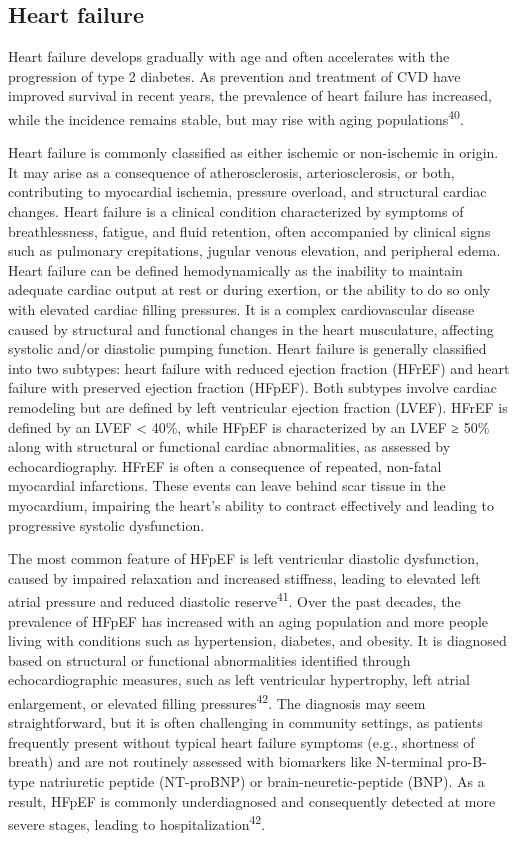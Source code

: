 \documentclass[
  a4paper,
  headsepline=true,
  open=any]{scrbook}
\begin{document}
\hypertarget{heart-failure}{%
\subsection{Heart failure}\label{heart-failure}}

Heart failure develops gradually with age and often accelerates with the
progression of type 2 diabetes. As prevention and treatment of CVD have
improved survival in recent years, the prevalence of heart failure has
increased, while the incidence remains stable, but may rise with aging
populations\textsuperscript{40}.

Heart failure is commonly classified as either ischemic or non-ischemic
in origin. It may arise as a consequence of atherosclerosis,
arteriosclerosis, or both, contributing to myocardial ischemia, pressure
overload, and structural cardiac changes. Heart failure is a clinical
condition characterized by symptoms of breathlessness, fatigue, and
fluid retention, often accompanied by clinical signs such as pulmonary
crepitations, jugular venous elevation, and peripheral edema. Heart
failure can be defined hemodynamically as the inability to maintain
adequate cardiac output at rest or during exertion, or the ability to do
so only with elevated cardiac filling pressures. It is a complex
cardiovascular disease caused by structural and functional changes in
the heart musculature, affecting systolic and/or diastolic pumping
function. Heart failure is generally classified into two subtypes: heart
failure with reduced ejection fraction (HFrEF) and heart failure with
preserved ejection fraction (HFpEF). Both subtypes involve cardiac
remodeling but are defined by left ventricular ejection fraction (LVEF).
HFrEF is defined by an LVEF \textless{} 40\%, while HFpEF is
characterized by an LVEF ≥ 50\% along with structural or functional
cardiac abnormalities, as assessed by echocardiography. HFrEF is often a
consequence of repeated, non-fatal myocardial infarctions. These events
can leave behind scar tissue in the myocardium, impairing the heart's
ability to contract effectively and leading to progressive systolic
dysfunction.

The most common feature of HFpEF is left ventricular diastolic
dysfunction, caused by impaired relaxation and increased stiffness,
leading to elevated left atrial pressure and reduced diastolic
reserve\textsuperscript{41}. Over the past decades, the prevalence of
HFpEF has increased with an aging population and more people living with
conditions such as hypertension, diabetes, and obesity. It is diagnosed
based on structural or functional abnormalities identified through
echocardiographic measures, such as left ventricular hypertrophy, left
atrial enlargement, or elevated filling pressures\textsuperscript{42}.
The diagnosis may seem straightforward, but it is often challenging in
community settings, as patients frequently present without typical heart
failure symptoms (e.g., shortness of breath) and are not routinely
assessed with biomarkers like N-terminal pro-B-type natriuretic peptide
(NT-proBNP) or brain-neuretic-peptide (BNP). As a result, HFpEF is
commonly underdiagnosed and consequently detected at more severe stages,
leading to hospitalization\textsuperscript{42}.
\end{document}
